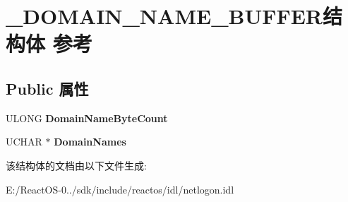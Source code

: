 \hypertarget{struct___d_o_m_a_i_n___n_a_m_e___b_u_f_f_e_r}{}\section{\+\_\+\+D\+O\+M\+A\+I\+N\+\_\+\+N\+A\+M\+E\+\_\+\+B\+U\+F\+F\+E\+R结构体 参考}
\label{struct___d_o_m_a_i_n___n_a_m_e___b_u_f_f_e_r}
\subsection*{Public 属性}
\begin{DoxyCompactItemize}
\item 
\mbox{\label{struct___d_o_m_a_i_n___n_a_m_e___b_u_f_f_e_r_aaa5c88900d5f99f027a6b3967045f5a6}} 
U\+L\+O\+NG {\bfseries Domain\+Name\+Byte\+Count}
\item 
\mbox{\label{struct___d_o_m_a_i_n___n_a_m_e___b_u_f_f_e_r_a102b4bc5ca1fb553c43c1c23d3d73583}} 
U\+C\+H\+AR $\ast$ {\bfseries Domain\+Names}
\end{DoxyCompactItemize}


该结构体的文档由以下文件生成\+:\begin{DoxyCompactItemize}
\item 
E\+:/\+React\+O\+S-\/0../sdk/include/reactos/idl/netlogon.\+idl\end{DoxyCompactItemize}
